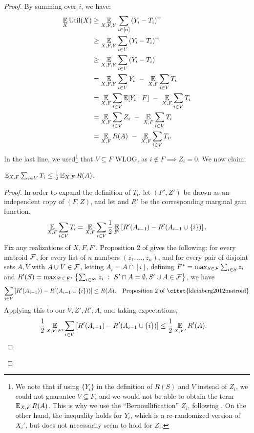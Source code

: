 \begin{proof}
  By summing over $i$, we have:
  \begin{align}
    \operatorname*{\mathbb{E}}_X \text{Util}(X)
    &\geq \operatorname*{\mathbb{E}}_{X,F,Y} \sum_{i \in [n]} \left( Y_i - T_i \right)^+  \nonumber \\
    &\geq \operatorname*{\mathbb{E}}_{X,F,Y} \sum_{i \in V} \left( Y_i - T_i \right)^+  \nonumber \\
    &\geq \operatorname*{\mathbb{E}}_{X,F,Y} \sum_{i \in V} \left( Y_i - T_i \right)  \nonumber \\
    &=    \operatorname*{\mathbb{E}}_{X,F,Y} \sum_{i \in V} Y_i ~ - ~ \operatorname*{\mathbb{E}}_{X,F} \sum_{i \in V} T_i  \nonumber \\
    &=    \operatorname*{\mathbb{E}}_{X,F} \sum_{i \in V} \operatorname*{\mathbb{E}}[Y_i \mid F] ~ - ~ \operatorname*{\mathbb{E}}_{X,F} \sum_{i \in V} T_i  \nonumber \\
    &=    \operatorname*{\mathbb{E}}_{X,F} \sum_{i \in V} Z_i ~ - ~ \operatorname*{\mathbb{E}}_{X,F} \sum_{i \in V} T_i   \label{eq:matroid-cabinet-z} \\
    &=    \operatorname*{\mathbb{E}}_{X,F} R(A) ~ - ~ \operatorname*{\mathbb{E}}_{X,F} \sum_{i \in V} T_i . \label{eq:matroid-cabinet-end}
  \end{align}
  In the last line, we used\footnote{We note that if using $\{Y_i\}$ in the definition of $R(S)$ and $V$ instead of $Z_i$, we could not guarantee $V \subseteq F$, and we would not be able to obtain the term $\operatorname*{\mathbb{E}}_{X,F} R(A)$. This is why we use the ``Bernoullification'' $Z_i$, following \citet{lee2018optimal}. On the other hand, the \SAUP{} inequality holds for $Y_i$, which is a re-randomized version of $X_i'$, but does not necessarily seem to hold for $Z_i$.}
 that $V \subseteq F$ WLOG, as $i \not\in F \implies Z_i = 0$.
  We now claim:
  \begin{lemma} \label{lemma:kw12}
    $\operatorname*{\mathbb{E}}_{X,F} \sum_{i \in V} T_i \leq \frac{1}{2} \operatorname*{\mathbb{E}}_{X,F} R(A)$.
  \end{lemma}
  \begin{proof}
    In order to expand the definition of $T_i$, let $(F',Z')$ be drawn as an independent copy of $(F,Z)$, and let and $R'$ be the corresponding marginal gain function.
    \begin{align*}
      \operatorname*{\mathbb{E}}_{X,F} \sum_{i \in V} T_i = \operatorname*{\mathbb{E}}_{X,F} \sum_{i \in V} \frac{1}{2} \operatorname*{\mathbb{E}}_{F'} \left[ R'(A_{i-1}) - R'(A_{i-1} \cup \{i\}) \right] .
   \end{align*}
    Fix any realizations of $X,F,F'$.
    Proposition 2 of \citet{kleinberg2012matroid} gives the following: for every matroid $\mathcal{F}$, for every list of $n$ numbers $(z_1,\dots,z_n)$, and for every pair of disjoint sets $A,V$ with $A \cup V \in \mathcal{F}$, letting $A_i = A \cap [i]$, defining $F^* = \max_{S \in \mathcal{F}} \sum_{i \in S} z_i$ and $R'(S) = \max_{S' \subseteq F^*} \left\{ \sum_{i \in S'} z_i ~:~ S' \cap A = \emptyset, S' \cup A \in \mathcal{F} \right\}$, we have
    \begin{align*}
       \sum_{i \in V} \left[ R'(A_{i-1})) - R'(A_{i-1} \cup \{i\})) \right] &\leq R(A) .  & \text{Proposition 2 of \citet{kleinberg2012matroid}}
    \end{align*}
    Applying this to our $V, Z', R', A$, and taking expectations,
    \begin{align*}
      \frac{1}{2} \operatorname*{\mathbb{E}}_{X,F,F'} \sum_{i \in V} \left[ R'(A_{i-1}) - R'(A_{i-1} \cup \{i\}) \right]
     &\leq \frac{1}{2} \operatorname*{\mathbb{E}}_{X,F'} R'(A) .
  \end{align*}
   

\end{proof}
\end{proof}
